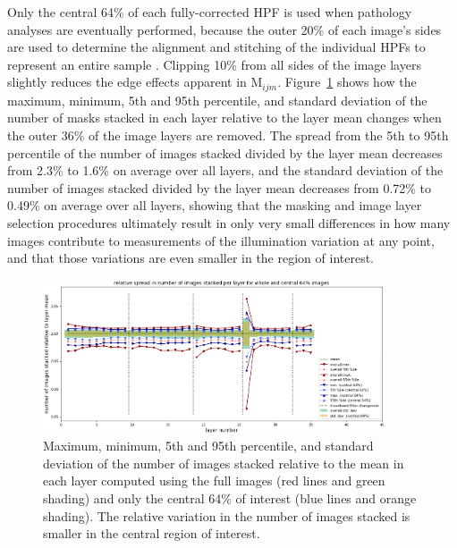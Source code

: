 \documentclass[letterpaper,11pt]{article}
\newcommand{\reffig}[1]{Figure~\ref{#1}}
\newcommand{\Mu}{\mathrm{M}}
\begin{document}
Only the central 64\% of each fully-corrected HPF is used when pathology analyses are eventually performed, because the outer 20\% of each image's sides are used to determine the alignment and stitching of the individual HPFs to represent an entire sample \cite{Heshy}. Clipping 10\% from all sides of the image layers slightly reduces the edge effects apparent in $\Mu_{ijm}$. \reffig{fig:removing_image_edges_effect_on_mask_stacks} shows how the maximum, minimum, 5th and 95th percentile, and standard deviation of the number of masks stacked in each layer relative to the layer mean changes when the outer 36\% of the image layers are removed. The spread from the 5th to 95th percentile of the number of images stacked divided by the layer mean decreases from 2.3\% to 1.6\% on average over all layers, and the standard deviation of the number of images stacked divided by the layer mean decreases from 0.72\% to 0.49\% on average over all layers, showing that the masking and image layer selection procedures ultimately result in only very small differences in how many images contribute to measurements of the illumination variation at any point, and that those variations are even smaller in the region of interest.

\begin{figure}[!ht]
\centering
\includegraphics[width=0.90\textwidth]{images/measuring_flatfield_corrections/mask_stack_variation_reduction}
\caption{\footnotesize Maximum, minimum, 5th and 95th percentile, and standard deviation of the number of images stacked relative to the mean in each layer computed using the full images (red lines and green shading) and only the central 64\% of interest (blue lines and orange shading). The relative variation in the number of images stacked is smaller in the central region of interest.}
\label{fig:removing_image_edges_effect_on_mask_stacks}
\end{figure} 
\end{document}
